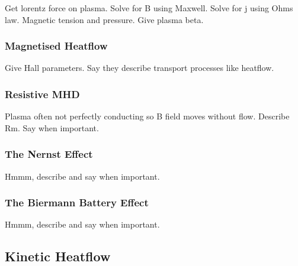 Get lorentz force on plasma.
Solve for B using Maxwell.
Solve for j using Ohms law.
Magnetic tension and pressure.
Give plasma beta.

\subsubsection{Magnetised Heatflow}%
\label{sec:theory_magheatflow}

Give Hall parameters.
Say they describe transport processes like heatflow.

\subsubsection{Resistive MHD}%
\label{sec:theory_resisMHD}

Plasma often not perfectly conducting so B field moves without flow.
Describe Rm.
Say when important.

\subsubsection{The Nernst Effect}%
\label{sec:theory_nernst}

Hmmm, describe and say when important.

\subsubsection{The Biermann Battery Effect}%
\label{sec:theory_biermann}

Hmmm, describe and say when important.

\subsection{Kinetic Heatflow}%
\label{sec:theory_kineticheatflow}

